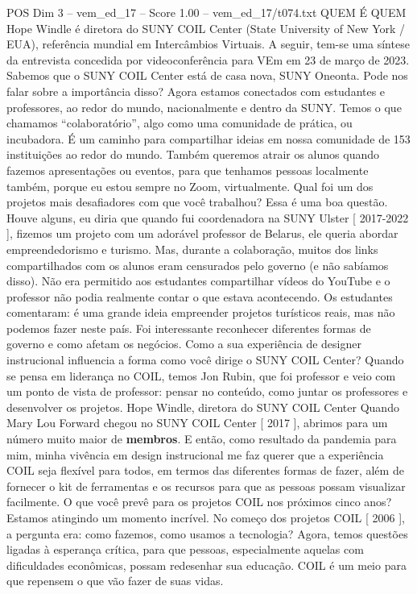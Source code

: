 \begin{textsample}{POS Dim 3 – vem\_ed\_17 – Score 1.00 – vem\_ed\_17/t074.txt}  \label{ex:f3_pos_179}
QUEM É QUEM Hope Windle é diretora do SUNY COIL Center (State University of New York / EUA), referência mundial em Intercâmbios Virtuais.
A seguir, tem-se uma síntese da entrevista concedida por videoconferência para VEm em 23 de março de 2023.
Sabemos que o SUNY COIL Center está de casa nova, SUNY Oneonta.
Pode nos falar sobre a importância disso?
Agora estamos conectados com estudantes e professores, ao redor do mundo, nacionalmente e dentro da SUNY.
Temos o que chamamos “colaboratório”, algo como uma comunidade de prática, ou incubadora.
É um caminho para compartilhar ideias em nossa comunidade de 153 instituições ao redor do mundo.
Também queremos atrair os alunos quando fazemos apresentações ou eventos, para que tenhamos pessoas localmente também, porque eu estou sempre no Zoom, virtualmente.
Qual foi um dos projetos mais desafiadores com que você trabalhou?
Essa é uma boa questão.
Houve alguns, eu diria que quando fui coordenadora na SUNY Ulster [ 2017-2022 ], fizemos um projeto com um adorável professor de Belarus, ele queria abordar empreendedorismo e turismo.
Mas, durante a colaboração, muitos dos links compartilhados com os alunos eram censurados pelo governo (e não sabíamos disso).
Não era permitido aos estudantes compartilhar vídeos do YouTube e o professor não podia realmente contar o que estava acontecendo.
Os estudantes comentaram: é uma grande ideia empreender projetos turísticos reais, mas não podemos fazer neste país.
Foi interessante reconhecer diferentes formas de governo e como afetam os negócios.
Como a sua experiência de designer instrucional influencia a forma como você dirige o SUNY COIL Center?
Quando se pensa em liderança no COIL, temos Jon Rubin, que foi professor e veio com um ponto de vista de professor: pensar no conteúdo, como juntar os professores e desenvolver os projetos.
Hope Windle, diretora do SUNY COIL Center Quando Mary Lou Forward chegou no SUNY COIL Center [ 2017 ], abrimos para um número muito maior de \textbf{membros}.
E então, como resultado da pandemia para mim, minha vivência em design instrucional me faz querer que a experiência COIL seja flexível para todos, em termos das diferentes formas de fazer, além de fornecer o kit de ferramentas e os recursos para que as pessoas possam visualizar facilmente.
O que você prevê para os projetos COIL nos próximos cinco anos?
Estamos atingindo um momento incrível.
No começo dos projetos COIL [ 2006 ], a pergunta era: como fazemos, como usamos a tecnologia?
Agora, temos questões ligadas à esperança crítica, para que pessoas, especialmente aquelas com dificuldades econômicas, possam redesenhar sua educação.
COIL é um meio para que repensem o que vão fazer de suas vidas.

\end{textsample}
